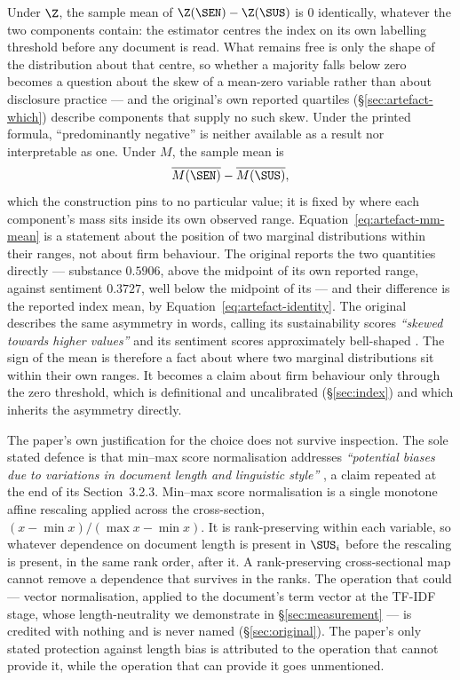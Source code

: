 Under $\Z$, the sample mean of $\Z(\SEN) - \Z(\SUS)$ is $0$ identically,
whatever the two components contain: the estimator centres the index on its own
labelling threshold before any document is read. What remains free is only the
shape of the distribution about that centre, so whether a majority falls below
zero becomes a question about the skew of a mean-zero variable rather than about
disclosure practice --- and the original's own reported quartiles
(\S\ref{sec:artefact-which}) describe components that supply no such skew.
Under the printed formula, ``predominantly negative'' is neither available as a
result nor interpretable as one. Under $M$, the sample mean is
\begin{equation}
\label{eq:artefact-mm-mean}
\overline{M(\SEN)} - \overline{M(\SUS)},
\end{equation}
which the construction pins to no particular value; it is fixed by where each
component's mass sits inside its own observed range.
Equation~\eqref{eq:artefact-mm-mean} is a statement about the position of two
marginal distributions within their ranges, not about firm behaviour. The
original reports the two quantities directly --- substance $0.5906$, above the
midpoint of its own reported range, against sentiment $0.3727$, well below the
midpoint of its --- and their difference is the reported index mean, by
Equation~\eqref{eq:artefact-identity}. The original describes the same
asymmetry in words, calling its sustainability scores \emph{``skewed towards
higher values''} and its sentiment scores approximately bell-shaped
\citep[p.~6]{lagasio2024}. The sign of the mean is therefore a fact about where
two marginal distributions sit within their own ranges. It becomes a claim
about firm behaviour only through the zero threshold, which is definitional and
uncalibrated (\S\ref{sec:index}) and which inherits the asymmetry directly.

The paper's own justification for the choice does not survive inspection. The
sole stated defence is that min--max score normalisation addresses
\emph{``potential biases due to variations in document length and linguistic
style''} \citep[p.~4]{lagasio2024}, a claim repeated at the end of its
Section~3.2.3. Min--max score normalisation is a single monotone affine
rescaling applied across the cross-section, $(x - \min x)/(\max x - \min x)$.
It is rank-preserving within each variable, so whatever dependence on document
length is present in $\SUS_i$ before the rescaling is present, in the same rank
order, after it. A rank-preserving cross-sectional map cannot remove a
dependence that survives in the ranks. The operation that could --- vector
normalisation, applied to the document's term vector at the TF-IDF stage, whose
length-neutrality we demonstrate in \S\ref{sec:measurement} --- is credited with
nothing and is never named (\S\ref{sec:original}). The paper's only stated
protection against length bias is attributed to the operation that cannot
provide it, while the operation that can provide it goes unmentioned.


